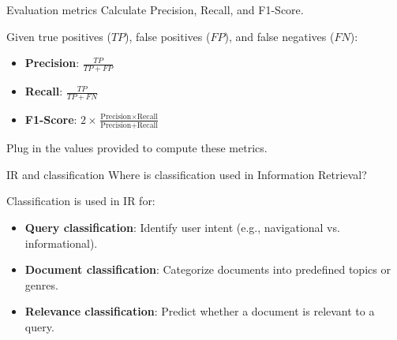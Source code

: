 \documentclass{article}
\begin{document}
\begin{exercise}{Evaluation metrics}
  Calculate Precision, Recall, and F1-Score.

  \begin{solution}
    Given true positives (\(TP\)), false positives (\(FP\)), and false negatives (\(FN\)):
    \begin{itemize}
        \item \textbf{Precision}: \( \frac{TP}{TP + FP} \)
        \item \textbf{Recall}: \( \frac{TP}{TP + FN} \)
        \item \textbf{F1-Score}: \( 2 \times \frac{\text{Precision} \times \text{Recall}}{\text{Precision} + \text{Recall}} \)
    \end{itemize}
    Plug in the values provided to compute these metrics.
  \end{solution}
\end{exercise}

\begin{exercise}{IR and classification}
  Where is classification used in Information Retrieval?

  \begin{solution}
    Classification is used in IR for:
    \begin{itemize}
        \item \textbf{Query classification}: Identify user intent (e.g., navigational vs. informational).
        \item \textbf{Document classification}: Categorize documents into predefined topics or genres.
        \item \textbf{Relevance classification}: Predict whether a document is relevant to a query.
    \end{itemize}
  \end{solution}
\end{exercise}
\end{document}
